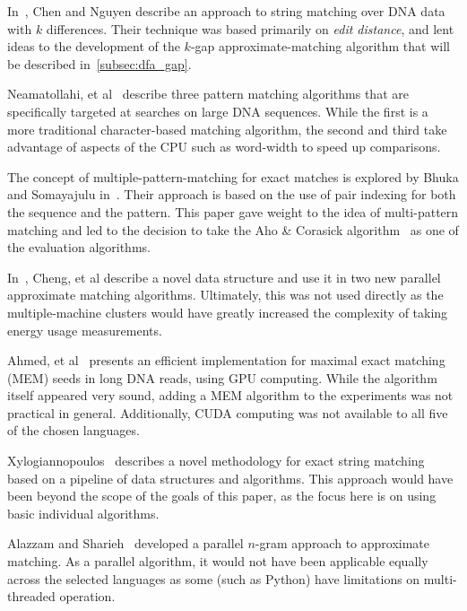 In~\cite{chen2021string}, Chen and Nguyen describe an approach to string matching over DNA data with $k$ differences. Their technique was based primarily on \textit{edit distance}, and lent ideas to the development of the $k$-gap approximate-matching algorithm that will be described in~\ref{subsec:dfa_gap}.

Neamatollahi, et al~\cite{neamatollahi} describe three pattern matching algorithms that are specifically targeted at searches on large DNA sequences. While the first is a more traditional character-based matching algorithm, the second and third take advantage of aspects of the CPU such as word-width to speed up comparisons.

The concept of multiple-pattern-matching for exact matches is explored by Bhuka and Somayajulu in~\cite{bhukya}. Their approach is based on the use of pair indexing for both the sequence and the pattern. This paper gave weight to the idea of multi-pattern matching and led to the decision to take the Aho \& Corasick algorithm~\cite{aho} as one of the evaluation algorithms.

In~\cite{cheng2003approximate}, Cheng, et al describe a novel data structure and use it in two new parallel approximate matching algorithms. Ultimately, this was not used directly as the multiple-machine clusters would have greatly increased the complexity of taking energy usage measurements.

Ahmed, et al~\cite{ahmed2020efficient} presents an efficient implementation for maximal exact matching (MEM) seeds in long DNA reads, using GPU computing. While the algorithm itself appeared very sound, adding a MEM algorithm to the experiments was not practical in general. Additionally, CUDA computing was not available to all five of the chosen languages.

Xylogiannopoulos~\cite{xylogiannopoulos2019exhaustive} describes a novel methodology for exact string matching based on a pipeline of data structures and algorithms. This approach would have been beyond the scope of the goals of this paper, as the focus here is on using basic individual algorithms.

Alazzam and Sharieh~\cite{alazzam2018parallel} developed a parallel $n$-gram approach to approximate matching. As a parallel algorithm, it would not have been applicable equally across the selected languages as some (such as Python) have limitations on multi-threaded operation.
